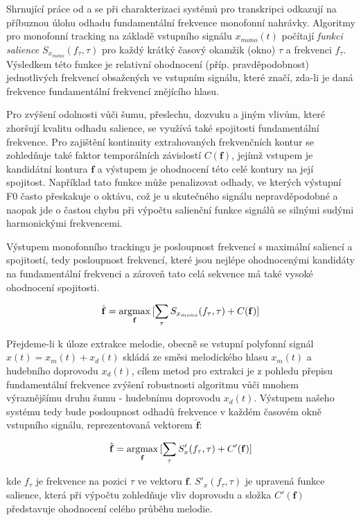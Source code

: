 Shrnující práce od \cite{Poliner2007} a \cite{Salamon2014} se při charakterizaci systémů pro transkripci odkazují na příbuznou úlohu odhadu fundamentální frekvence monofonní nahrávky. Algoritmy pro monofonní tracking na základě vstupního signálu $x_{mono}(t)$ počítají \emph{funkci salience} $S_{x_{mono}}(f_\tau, \tau)$ pro každý krátký časový okamžik (okno) $\tau$ a frekvenci $f_\tau$. Výsledkem této funkce je relativní ohodnocení (příp. pravděpodobnost) jednotlivých frekvencí obsažených ve vstupním signálu, které značí, zda-li je daná frekvence fundamentální frekvencí znějícího hlasu. 

Pro zvýšení odolnosti vůči šumu, přeslechu, dozvuku a jiným vlivům, které zhoršují kvalitu odhadu salience, se využívá také spojitosti fundamentální frekvence. Pro zajištění kontinuity extrahovaných frekvenčních kontur se zohledňuje také faktor temporálních závislostí $C(\mathbf{f})$, jejímž vstupem je kandidátní kontura $\mathbf{f}$ a výstupem je ohodnocení této celé kontury na její spojitost. Například tato funkce může penalizovat odhady, ve kterých výstupní F0 často přeskakuje o oktávu, což je u skutečného signálu nepravděpodobné a naopak jde o častou chybu při výpočtu salienční funkce signálů se silnými sudými harmonickými frekvencemi.

Výstupem monofonního trackingu je posloupnost frekvencí s maximální saliencí a spojitostí, tedy posloupnost frekvencí, které jsou nejlépe ohodnocenými kandidáty na fundamentální frekvenci a zároveň tato celá sekvence má také vysoké ohodnocení spojitosti.

    $$\hat{\mathbf{f}} = \argmax_{\mathbf{f}}{[\sum_{\tau}{S_{x_{mono}}(f_\tau, \tau)} + C(\mathbf{f})]}$$

Přejdeme-li k úloze extrakce melodie, obecně se vstupní polyfonní signál $x(t) = x_m(t) + x_d(t)$ skládá ze směsi melodického hlasu $x_m(t)$ a hudebního doprovodu $x_d(t)$, cílem metod pro extrakci je z pohledu přepisu fundamentální frekvence zvýšení robustnosti algoritmu vůči mnohem výraznějšímu druhu šumu - hudebnímu doprovodu $x_d(t)$. Výstupem našeho systému tedy bude posloupnost odhadů frekvence v každém časovém okně vstupního signálu, reprezentovaná vektorem $\hat{\mathbf{f}}$:

    $$\hat{\mathbf{f}} = \argmax_{\mathbf{f}}{[\sum_{\tau}{S'_x(f_\tau, \tau)} + C'(\mathbf{f})]}$$

kde $f_\tau$ je frekvence na pozici $\tau$ ve vektoru $\mathbf{f}$. $S'_x(f_\tau, \tau)$ je upravená funkce salience, která při výpočtu zohledňuje vliv doprovodu a složka $C'(\mathbf{f})$ představuje ohodnocení celého průběhu melodie.

